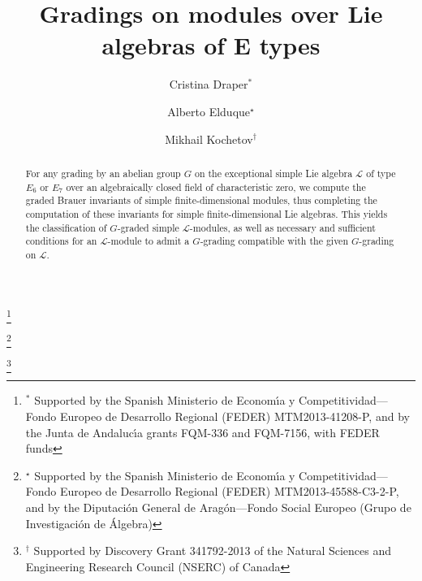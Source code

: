 \documentclass[a4paper,reqno]{amsart}
\theoremstyle{definition}
\numberwithin{theorem}{section}
\numberwithin{equation}{section}
\begin{document}
\title{Gradings on modules over Lie algebras of E types}

\author[C.~Draper]{Cristina Draper${}^*$}
\address{Departamento de Matem\'{a}tica Aplicada, Escuela de las Ingenier\'{\i}as, Universidad de M\'{a}laga,
Ampliaci\'{o}n Campus de Teatinos, 29071 M\'{a}laga, Spain}
\thanks{${}^*$ Supported by the Spanish Ministerio de Econom\'{\i}a y Competitividad---Fondo Europeo de
Desarrollo Regional (FEDER) MTM2013-41208-P, and by the Junta de Andaluc\'{\i}a grants FQM-336 and FQM-7156, with FEDER funds}

\author[A.~Elduque]{Alberto Elduque${}^\star$}
\address{Departamento de Matem\'{a}ticas
 e Instituto Universitario de Matem\'aticas y Aplicaciones,
 Universidad de Zaragoza, 50009 Zaragoza, Spain}
\thanks{${}^\star$ Supported by the Spanish Ministerio de Econom\'{\i}a y Competitividad---Fondo Europeo de Desarrollo Regional (FEDER) MTM2013-45588-C3-2-P, and by the Diputaci\'on General de Arag\'on---Fondo Social Europeo (Grupo de Investigaci\'on de \'Algebra)}

\author[M. Kochetov]{Mikhail Kochetov${}^\dagger$}
\address{Department of Mathematics and Statistics,
 Memorial University of Newfoundland,
 St. John's, NL, A1C5S7, Canada}
\thanks{${}^\dagger$ Supported by Discovery Grant 341792-2013 of the Natural Sciences and Engineering Research Council (NSERC) of Canada}



\date{}

\begin{abstract}
For any grading by an abelian group $G$ on the exceptional simple Lie algebra ${\mathcal{L}}$ of type $E_6$ or $E_7$ over an algebraically closed field of characteristic zero, we compute the graded Brauer invariants of simple finite-dimensional modules, thus completing the computation of these invariants for simple finite-dimensional Lie algebras. This yields the classification of $G$-graded simple ${\mathcal{L}}$-modules, as well as necessary and sufficient conditions for an ${\mathcal{L}}$-module to admit a $G$-grading compatible with the given $G$-grading on ${\mathcal{L}}$.
\end{abstract}

\maketitle
\end{document}
